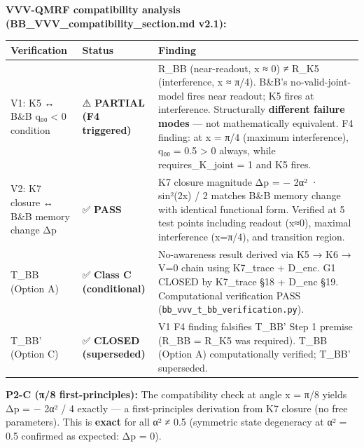 \documentclass[
  11pt,
]{article}
\newcounter{none} %
\begin{document}
\textbf{VVV-QMRF compatibility analysis
(BB\_VVV\_compatibility\_section.md v2.1):}

{\def\LTcaptype{none} %
\begin{longtable}[]{@{}
  >{\raggedright\arraybackslash}p{}
  >{\raggedright\arraybackslash}p{}
  >{\raggedright\arraybackslash}p{}@{}}
\toprule\noalign{}
\begin{minipage}[b]{\linewidth}\raggedright
Verification
\end{minipage} & \begin{minipage}[b]{\linewidth}\raggedright
Status
\end{minipage} & \begin{minipage}[b]{\linewidth}\raggedright
Finding
\end{minipage} \\
\midrule\noalign{}
\endhead
\bottomrule\noalign{}
\endlastfoot
V1: K5 ↔ B\&B q₀₀ \textless{} 0 condition & ⚠️ \textbf{PARTIAL (F4
triggered)} & R\_BB (near-readout, x ≈ 0) ≠ R\_K5 (interference, x ≈
π/4). B\&B's no-valid-joint-model fires near readout; K5 fires at
interference. Structurally \textbf{different failure modes} --- not
mathematically equivalent. F4 finding: at x = π/4 (maximum
interference), q₀₀ = 0.5 \textgreater{} 0 always, while
requires\_K\_joint = 1 and K5 fires. \\
V2: K7 closure ↔ B\&B memory change Δp & ✅ \textbf{PASS} & K7 closure
magnitude Δp = \textbar1 − 2α²\textbar{} · sin²(2x) / 2 matches B\&B
memory change with identical functional form. Verified at 5 test points
including readout (x≈0), maximal interference (x=π/4), and transition
region. \\
T\_BB (Option A) & ✅ \textbf{Class C (conditional)} & No-awareness
result derived via K5 → K6 → V=0 chain using K7\_trace + D\_enc. G1
CLOSED by K7\_trace §18 + D\_enc §19. Computational verification PASS
(\texttt{bb\_vvv\_t\_bb\_verification.py}). \\
T\_BB' (Option C) & ✅ \textbf{CLOSED (superseded)} & V1 F4 finding
falsifies T\_BB' Step 1 premise (R\_BB = R\_K5 was required). T\_BB
(Option A) computationally verified; T\_BB' superseded. \\
\end{longtable}
}

\textbf{P2-C (π/8 first-principles):} The compatibility check at angle x
= π/8 yields Δp =  − 2α²\textbar{} / 4 exactly --- a
first-principles derivation from K7 closure (no free parameters). This
is \textbf{exact} for all α² ≠ 0.5 (symmetric state degeneracy at α² =
0.5 confirmed as expected: Δp = 0).
\end{document}
